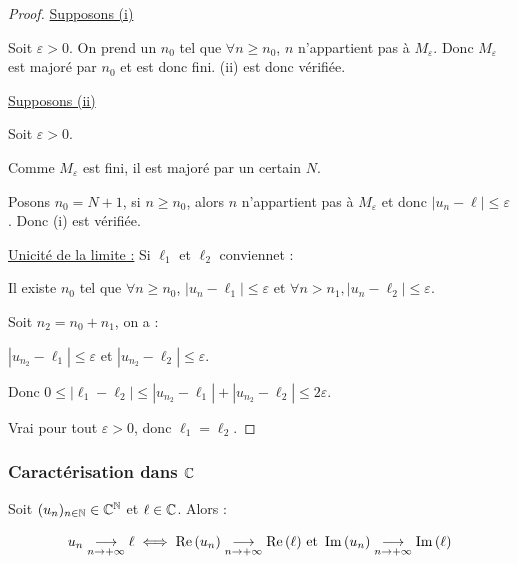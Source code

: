 \begin{proof}
    \uline{Supposons (i)}

    \vspace{0.2em}Soit $\varepsilon > 0$. On prend un $n_0$ tel que $\forall n \geqslant n_0$, $n$ n'appartient pas 
    à $M_\varepsilon$. Donc $M_\varepsilon$ est majoré par $n_0$ et est donc fini. (ii) est donc vérifiée.

    \vspace{0.5em}\qquad \uline{Supposons (ii)}

    \vspace{0.2em}Soit $\varepsilon > 0$. 

    Comme $M_\varepsilon$ est fini, il est majoré par un certain $N$. 

    Posons $n_0 = N + 1$, si $n \geqslant n_0$, alors $n$ n'appartient pas à $M_\varepsilon$ et donc
    $|u_n - \ell| \leqslant \varepsilon$. Donc (i) est vérifiée.


    \vspace{0.5em}\qquad \uline{Unicité de la limite :}
    \vspace{0.2em} Si $\ell_1$ et $\ell_2$ conviennet : 

    Il existe $n_0$ tel que $\forall n \geqslant n_0$, $|u_n - \ell_1| \leqslant \varepsilon$ et $\forall n > n_1, |u_n - \ell_2| \leqslant \varepsilon$.

    \vspace{0.2em} Soit $n_2 = n_0 + n_1$, on a :

    $|u_{n_2} - \ell_1| \leqslant \varepsilon$ et $|u_{n_2} - \ell_2| \leqslant \varepsilon$.

    Donc $0 \leqslant |\ell_1 - \ell_2| \leqslant |u_{n_2} - \ell_1| + |u_{n_2} - \ell_2| \leqslant 2\varepsilon$.

    Vrai pour tout $\varepsilon > 0$, donc $\ell_1 = \ell_2$.
\end{proof}

\subsubsection{Caractérisation dans \texorpdfstring{$\mathbb{C}$}{C}}

\begin{proposition}{}{}
    Soit $(u_n)_{n \in \mathbb{N}} \in \mathbb{C}^{\mathbb{N}}$ et $\ell \in \mathbb{C}$. Alors : 

    $$u_n \underset{n \to +\infty}{\longrightarrow} \ell \iff \operatorname{Re} \,(u_n) \underset{n \to +\infty}{\longrightarrow} \operatorname{Re} \,(\ell) \text{ et } \operatorname{Im} \,(u_n) \underset{n \to +\infty}{\longrightarrow} \operatorname{Im} \,(\ell)$$
\end{proposition}

